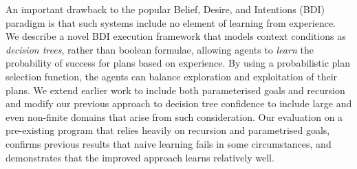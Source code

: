 An important drawback to the popular Belief, Desire, and Intentions (BDI)
paradigm is that such systems include no element of learning from experience.
We describe a novel BDI execution framework that models
context conditions as \emph{decision trees}, rather than boolean
formulae, allowing
agents to \emph{learn} the probability of success for plans based on
experience. By using a probabilistic plan selection function, the
agents can balance exploration and exploitation of their plans.
We extend earlier work to include both parameterised goals and
recursion and modify our previous approach to decision tree
confidence to include large and even non-finite domains that arise
from such consideration.
Our evaluation on a pre-existing program that relies heavily
on recursion and parametrised goals, confirms previous results
that naive learning fails in some circumstances, and
demonstrates that the improved approach learns relatively well.

